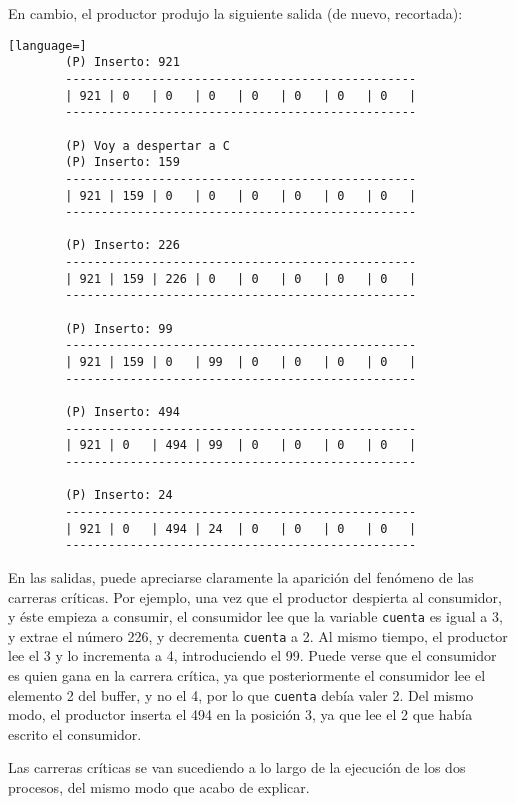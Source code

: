 \documentclass[a4paper]{article}
\begin{document}
En cambio, el productor produjo la siguiente salida (de nuevo, recortada):

\begin{lstlisting}[language=]
        (P) Inserto: 921
        -------------------------------------------------
        | 921 | 0   | 0   | 0   | 0   | 0   | 0   | 0   |
        -------------------------------------------------
        
        (P) Voy a despertar a C
        (P) Inserto: 159
        -------------------------------------------------
        | 921 | 159 | 0   | 0   | 0   | 0   | 0   | 0   |
        -------------------------------------------------
        
        (P) Inserto: 226
        -------------------------------------------------
        | 921 | 159 | 226 | 0   | 0   | 0   | 0   | 0   |
        -------------------------------------------------
        
        (P) Inserto: 99
        -------------------------------------------------
        | 921 | 159 | 0   | 99  | 0   | 0   | 0   | 0   |
        -------------------------------------------------
        
        (P) Inserto: 494
        -------------------------------------------------
        | 921 | 0   | 494 | 99  | 0   | 0   | 0   | 0   |
        -------------------------------------------------
        
        (P) Inserto: 24
        -------------------------------------------------
        | 921 | 0   | 494 | 24  | 0   | 0   | 0   | 0   |
        -------------------------------------------------
\end{lstlisting}

En las salidas, puede apreciarse claramente la aparición del fenómeno de las carreras críticas. Por ejemplo, una vez que el productor despierta al consumidor, y éste empieza a consumir, el consumidor lee que la variable \texttt{cuenta} es igual a 3, y extrae el número 226, y decrementa \texttt{cuenta} a 2. Al mismo tiempo, el productor lee el 3 y lo incrementa a 4, introduciendo el 99. Puede verse que el consumidor es quien gana en la carrera crítica, ya que posteriormente el consumidor lee el elemento 2 del buffer, y no el 4, por lo que \texttt{cuenta} debía valer 2. Del mismo modo, el productor inserta el 494 en la posición 3, ya que lee el 2 que había escrito el consumidor.

Las carreras críticas se van sucediendo a lo largo de la ejecución de los dos procesos, del mismo modo que acabo de explicar.
\end{document}
